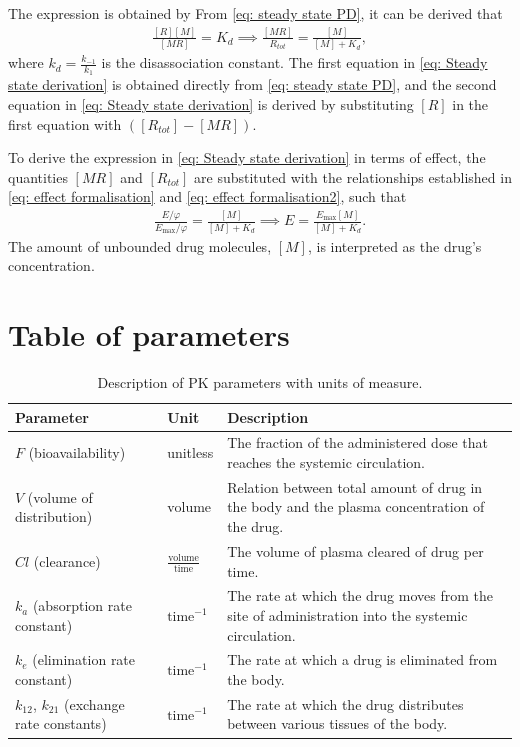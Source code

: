 The expression is obtained by 
From \eqref{eq: steady state PD}, it can be derived that
\begin{align} \label{eq: Steady state derivation}
    \frac{[R][M]}{[MR]} = K_d \implies \frac{[MR]}{R_{tot}} = \frac{[M]}{[M] + K_d},
\end{align}
where $k_d = \frac{k_{-1}}{k_1}$ is the disassociation constant.
The first equation in \eqref{eq: Steady state derivation} is obtained directly from \eqref{eq: steady state PD}, and the second equation in \eqref{eq: Steady state derivation} is derived by substituting $[R]$ in the first equation with $([R_{tot}] - [MR])$. 

To derive the expression in \eqref{eq: Steady state derivation} in terms of effect, the quantities $[MR]$ and $[R_{tot}]$ are substituted with the relationships established in \eqref{eq: effect formalisation} and \eqref{eq: effect formalisation2}, such that
\begin{align} \label{eq: Effect and concentration}
    \frac{E/\varphi}{E_{\text{max}}/\varphi} = \frac{[M]}{[M] + K_d} \implies E = \frac{E_{\text{max}}[M]}{[M] + K_d}.
\end{align}
The amount of unbounded drug molecules, $[M]$, is interpreted as the drug's concentration.


\section{Table of parameters}

\begin{table}[h!]
    \centering
    \renewcommand{\arraystretch}{1.5}
    \begin{tabular}{|p{3.4cm}|p{1.4 cm}|p{8.8cm}|}
        \hline
        \textbf{Parameter} & \textbf{Unit} & \textbf{Description} \\
        \hline
        $F$ (bioavailability) & unitless & The fraction of the administered dose that reaches the systemic circulation. \\
        \hline
        $V$ (volume of distribution) & $\text{volume}$ & Relation between total amount of drug in the body and the plasma concentration of the drug. \\
        \hline
        $Cl$ (clearance) & $\tfrac{\text{volume}}{\text{time}}$ & The volume of plasma cleared of drug per time. \\
        \hline
        $k_a$ (absorption rate constant) & $\text{time}^{-1}$ & The rate at which the drug moves from the site of administration into the systemic circulation. \\
        \hline
        $k_e$ (elimination rate constant) & $\text{time}^{-1}$ & The rate at which a drug is eliminated from the body.\\
        \hline
        $k_{12}$, $k_{21}$ (exchange rate constants) & $\text{time}^{-1}$ & The rate at which the drug distributes between various tissues of the body. \\
        \hline
    \end{tabular}
    \caption{Description of PK parameters with units of measure.}
    \label{tab: pharmacokinetic parameters summary}
\end{table}